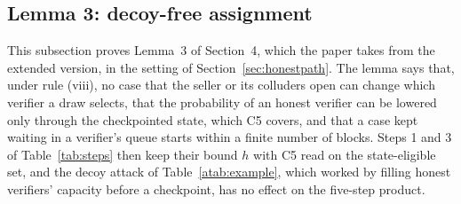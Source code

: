 \documentclass[10pt,a4paper]{article}
\theoremstyle{plain}
\theoremstyle{remark}
\begin{document}
\subsection{Lemma 3: decoy-free assignment}
\label{sec:decoy}

This subsection proves Lemma~3 of Section~4, which the paper takes from the extended version, in the setting of Section~\ref{sec:honestpath}. The lemma says that, under rule (viii), no case that the seller or its colluders open can change which verifier a draw selects, that the probability of an honest verifier can be lowered only through the checkpointed state, which C5 covers, and that a case kept waiting in a verifier's queue starts within a finite number of blocks. Steps 1 and 3 of Table~\ref{tab:steps} then keep their bound $h$ with C5 read on the state-eligible set, and the decoy attack of Table~\ref{atab:example}, which worked by filling honest verifiers' capacity before a checkpoint, has no effect on the five-step product.
\end{document}
